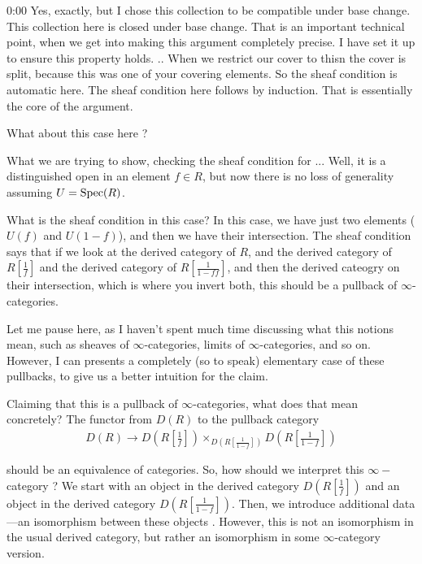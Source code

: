 \begin{unfinished}{0:00}
\clausen Yes, exactly, but I chose this collection to be compatible under base change. This collection here  is closed under base change. That is an important technical point, when we get into making this argument completely precise. 
I have set it up to ensure this property holds. .. 
When we restrict our cover to thisn the cover is split, because this was one of your covering elements. So the sheaf condition is automatic here. The sheaf condition here follows by induction. That is essentially the core of the argument.


What about this case here ?

What we are trying to show, checking the sheaf condition for ... Well, it is a distinguished open in an element $f \in R$, but now there is no loss of generality assuming $U = \operatorname{Spec}(R)$.


What is the sheaf condition in this case? In this  case, we have just two elements ($U(f)$ and $U(1-f)$), and then we have their intersection. The sheaf condition says that if we look at the derived category of $R$, and the derived category of $R[\frac{1}{f}]$ and the derived category of $R[\frac{1}{1-ff}]$, and then the derived cateogry on their intersection, which is where you invert both, this should be a pullback of $\infty$-categories.



Let me pause here, as I haven't spent much time discussing what this notions mean, such as sheaves of $\infty$-categories, limits of $\infty$-categories, and so on. However, I can presents a completely (so to speak) elementary case of these pullbacks, to give us a better intuition for the claim.

Claiming that this  is a pullback of $\infty$-categories, what does that mean concretely? The functor from $D(R)$ to the pullback category 
\begin{align*}
D(R) \to D(R[\frac{1}{f}]) \times_{D(R[\frac{1}{1-f}])} D(R[\frac{1}{1-f}])
\end{align*}

should be an equivalence of categories. So, how should we interpret this $\infty-$category ? We start with an object in the derived category $D(R[\frac{1}{f}])$ and an object in the derived category $D(R[\frac{1}{1-f}])$. Then, we  introduce additional data---an isomorphism between these objects . However, this is not an isomorphism in the usual derived category, but rather an isomorphism in some $\infty$-category version. 


\end{unfinished}

